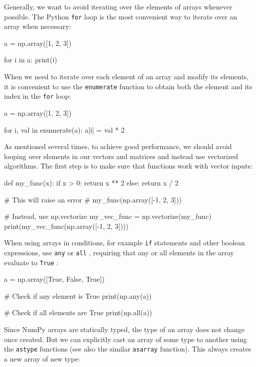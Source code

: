 Generally, we want to avoid iterating over the elements of arrays whenever possible. The Python
\texttt{for} loop is the most convenient way to iterate over an array when necessary:

\begin{codeblock}[language=python]
a = np.array([1, 2, 3])

for i in a:
    print(i)
\end{codeblock}

When we need to iterate over each element of an array and modify its elements, it is convenient to
use the \texttt{enumerate} function to obtain both the element and its index in the \texttt{for} loop:

\begin{codeblock}[language=python]
a = np.array([1, 2, 3])

for i, val in enumerate(a):
    a[i] = val * 2
\end{codeblock}

As mentioned several times, to achieve good performance, we should avoid looping over
elements in our vectors and matrices and instead use vectorized algorithms. The first step is to
make sure that functions work with vector inputs:

\begin{codeblock}[language=python]
def my_func(x):
    if x > 0:
        return x ** 2
    else:
        return x / 2

# This will raise an error
# my_func(np.array([-1, 2, 3]))

# Instead, use np.vectorize
my_vec_func = np.vectorize(my_func)
print(my_vec_func(np.array([-1, 2, 3])))
\end{codeblock}

When using arrays in conditions, for example \texttt{if} statements and other boolean expressions, use
\texttt{any} or \texttt{all} , requiring that any or all elements in the array evaluate to \texttt{True} :

\begin{codeblock}[language=python]
a = np.array([True, False, True])

# Check if any element is True
print(np.any(a))

# Check if all elements are True
print(np.all(a))
\end{codeblock}

Since NumPy arrays are statically typed, the type of an array does not change once created. But
we can explicitly cast an array of some type to another using the \texttt{astype} functions (see also the
similar \texttt{asarray} function). This always creates a new array of new type:

